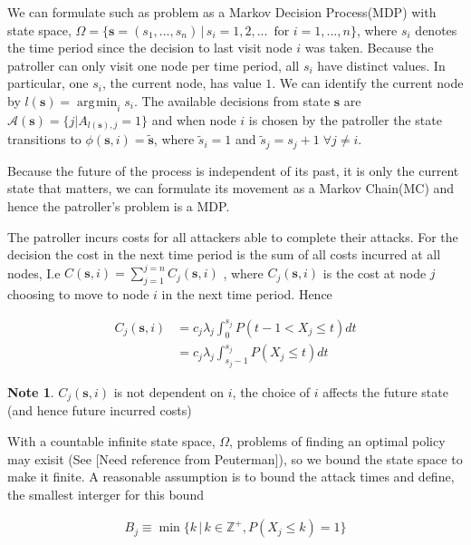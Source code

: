 \documentclass[a4paper,10pt]{article}
\DeclareMathOperator*{\argmin}{\arg\!\min}
\theoremstyle{definition}
\theoremstyle{definition}
\theoremstyle{remark}
\theoremstyle{definition}
\newtheorem*{note}{Note}
\begin{document}
We can formulate such as problem as a Markov Decision Process(MDP) with state space, $\Omega= \{\bm{s}=(s_{1},...,s_{n}) \, | \, s_{i}=1,2,... \, \text{ for } i=1,...,n \}$,  where $s_{i}$ denotes the time period since the decision to last visit node $i$ was taken. Because the patroller can only visit one node per time period, all $s_{i}$ have distinct values. In particular, one $s_{i}$, the current node, has value $1$. We can identify the current node by $l(\bm{s})=\argmin_{i} s_{i}$. The available decisions from state $\bm{s}$ are $\mathcal{A}(\bm{s})=\{j | A_{l(\bm{s}),j}=1 \}$ and when node $i$ is chosen by the patroller the state transitions to $\phi(\bm{s},i)=\widetilde{\bm{s}}$, where $\widetilde{s}_{i}=1$ and $\widetilde{s}_{j}=s_{j}+1 \; \forall j \neq i$.

Because the future of the process is independent of its past, it is only the current state that matters, we can formulate its movement as a Markov Chain(MC) and hence the patroller's problem is a MDP.

The patroller incurs costs for all attackers able to complete their attacks. For the decision the cost in the next time period is the sum of all costs incurred at all nodes, I.e $C(\bm{s},i)=\sum\limits_{j=1}^{j=n} C_{j}(\bm{s},i)$ , where $C_{j}(\bm{s},i)$ is the cost at node $j$ choosing to move to node $i$ in the next time period. Hence

\begin{align*}
C_{j}(\bm{s},i)&=c_{j} \lambda_{j} \int_{0}^{s_{j}} P(t-1 < X_{j} \leq t) dt \\
&=c_{j} \lambda_{j} \int_{s_{j}-1}^{s_{j}} P(X_{j} \leq t) dt
\end{align*}

\begin{note}
$C_{j}(\bm{s},i)$ is not dependent on $i$, the choice of $i$ affects the future state (and hence future incurred costs)
\end{note}
  
With a countable infinite state space, $\Omega$, problems of finding an optimal policy may exisit (See [Need reference from Peuterman]), so we bound the state space to make it finite. A reasonable assumption is to bound the attack times and define, the smallest interger for this bound

\begin{align}
\label{Equation:Definition of attack time bound}
B_{j} \equiv \min \{ k \, | \, k \in \mathbb{Z}^{+} , P(X_{j} \leq k)=1 \}
\end{align}
\end{document}
